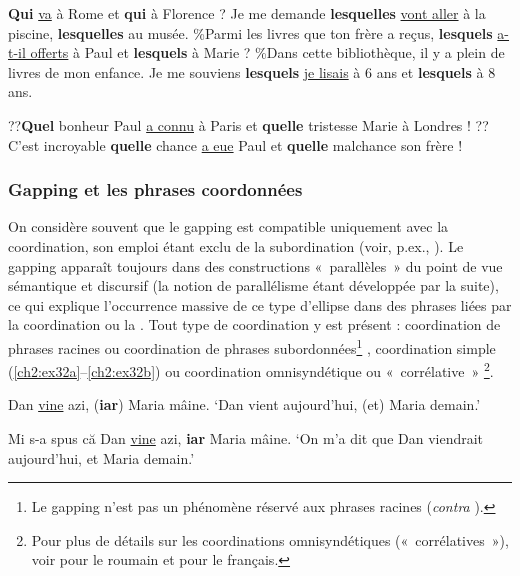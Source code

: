 \ea
\ea  \textbf{Qui} \uline{va} à Rome et \textbf{qui} à Florence ? \label{ch2:ex30a}
\ex  Je me demande \textbf{lesquelles} \uline{vont aller} à la piscine, \textbf{lesquelles} au musée. \label{ch2:ex30b}
\ex  \%Parmi les livres que ton frère a reçus, \textbf{lesquels} \uline{a-t-il offerts} à Paul et \textbf{lesquels} à Marie ?
\ex  \%Dans cette bibliothèque, il y a plein de livres de mon enfance. Je me souviens \textbf{lesquels} \uline{je lisais} à 6 ans et \textbf{lesquels} à 8 ans. 
\z
\z


\ea
\ea  ??\textbf{Quel} bonheur Paul \uline{a connu} à Paris et \textbf{quelle} tristesse Marie à Londres ! 
\ex ??C’est incroyable \textbf{quelle} chance \uline{a eue} Paul et \textbf{quelle} malchance son frère ! 
\z
\z


\subsubsection{Gapping et les phrases coordonnées}

On considère souvent que le gapping est compatible uniquement avec la coordination, son emploi étant exclu de la subordination (voir, p.ex., \citealt{Johnson2009}). Le gapping apparaît toujours dans des constructions «~parallèles~» du point de vue sémantique et discursif (la notion de parallélisme étant développée par la suite), ce qui explique l’occurrence massive de ce type d’ellipse dans des phrases liées par la coordination ou la . Tout type de coordination y est présent : coordination de phrases racines  ou coordination de phrases subordonnées\footnote{
 Le gapping n’est pas un phénomène réservé aux phrases racines (\textit{contra} \citealt{Hankamer1971,Hankamer1979,Ince2009}).} , coordination simple (\ref{ch2:ex32a}--\ref{ch2:ex32b}) ou coordination omnisyndétique ou «~corrélative~» \footnote{
 Pour plus de détails sur les coordinations omnisyndétiques («~corrélatives~»), voir \citet{Bilbiie2008} pour le roumain et \citet{Mouret2007} pour le français.}. 

\ea
\ea Dan \uline{vine} azi, (\textbf{iar}) Maria mâine. \label{ch2:ex32a}
\glt  ‘Dan vient aujourd’hui, (et) Maria demain.’   

\ex  Mi s-a spus că Dan \uline{vine} azi, \textbf{iar} Maria mâine. \label{ch2:ex32b}
\glt  ‘On m’a dit que Dan viendrait aujourd’hui, et Maria demain.’ 

